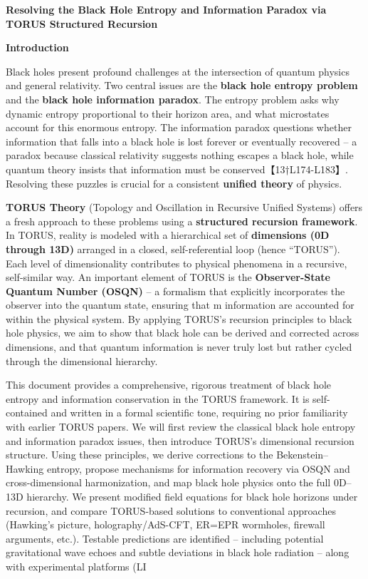 \documentclass[]{article}
\date{}
\begin{document}
\textbf{Resolving the Black Hole Entropy and Information Paradox via
TORUS Structured Recursion}

\textbf{Introduction}

Black holes present profound challenges at the intersection of quantum
physics and general relativity. Two central issues are the \textbf{black
hole entropy problem} and the \textbf{black hole information paradox}.
The entropy problem asks wh​y dynamic entropy proportional to their
horizon area, and what microstates account for this enormous entropy.
The information paradox questions whether information that falls into a
black hole is lost forever or eventually recovered -- a paradox because
classical relativity suggests nothing escapes a black hole, while
quantum theory insists that information must be
conserved【13†L174-L183】. Resolving these puzzles is crucial for a
consistent \textbf{unified theory} of physics.

\textbf{TORUS Theory} (Topology and Oscillation in Recursive Unified
Systems) offers a fresh approach to these problems using a
\textbf{structured recursion framework}. In TORUS, reality is modeled
with a hierarchical set of \textbf{dimensions (0D through 13D)} arranged
in a closed, self-referential loop (hence ``TORUS''). Each level of
dimensionality contributes to physical phenomena in a recursive,
self-similar way. An important element of TORUS is the
\textbf{Observer-State Quantum Number (OSQN)} -- a formalism that
explicitly incorporates the observer into the quantum state, ensuring
that m​ information are accounted for within the physical system. By
applying TORUS's recursion principles to black hole physics, we aim to
show that black​ hole can be derived and corrected across dimensions,
and that quantum information is never truly lost but rather cycled
through the dimensional hierarchy.

This document provides a comprehensive, rigorous treatment of black hole
entropy and information conservation in the TORUS framework. It is
self-contained and written in a formal scientific tone, requiring no
prior familiarity with earlier TORUS papers. We will first review the
classical black hole entropy and information paradox issues, then
introduce TORUS's dimensional recursion structure. Using these
principles, we derive corrections to the Bekenstein--Hawking entropy,
propose mechanisms for information recovery via OSQN and
cross-dimensional harmonization, and map black hole physics onto the
full 0D--13D hierarchy. We present modified field equations for black
hole horizons under recursion, and compare TORUS-based solutions to
conventional approaches (Hawking's picture, holography/AdS-CFT, ER=EPR
wormholes, firewall arguments, etc.). Testable predictions are
identified -- including potential gravitational wave echoes and subtle
deviations in black hole radiation -- along with experimental platforms
(LI​
\end{document}
